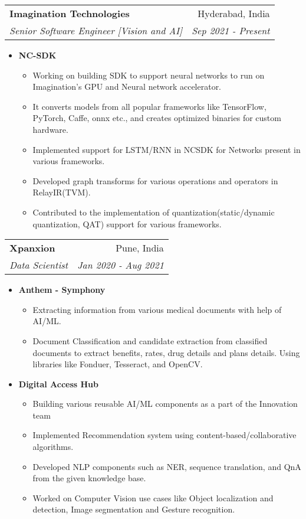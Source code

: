 \documentclass[letterpaper,11pt]{article}
\makeatletter
\newcommand{\resumeItem}[1]{
  \item\small{
    \textbf{#1}}
  }
\newcommand{\resumeSubheading}[4]{
  \vspace{-1pt}\item
    \begin{tabular*}{0.97\textwidth}[t]{l@{\extracolsep{\fill}}r}
      \textbf{#1} & #2 \\
      \textit{\small#3} & \textit{\small #4} \\
    \end{tabular*}\vspace{-5pt}
}
\newcommand{\resumeItemListStart}{\begin{itemize}}
\newcommand{\resumeItemListEnd}{\end{itemize}\vspace{-4pt}}
\newcommand{\resumeSubPointS}{\begin{itemize}}
\newcommand{\resumeSubPointE}{\end{itemize}\vspace{-4pt}}
\makeatother
\begin{document}
  \resumeSubheading
      {Imagination Technologies}{Hyderabad, India}
      {Senior Software Engineer [Vision and AI]}{Sep 2021 - Present}
      \resumeItemListStart
      	\resumeItem{NC-SDK}
        	\resumeSubPointS
   		\item Working on building SDK to support neural networks to run on Imagination's GPU and Neural network accelerator.
        		\item It converts models from all popular frameworks like TensorFlow, PyTorch, Caffe, onnx etc., and creates optimized binaries for custom hardware.
        		\item Implemented support for LSTM/RNN in  NCSDK for Networks present in various frameworks.
        		\item Developed graph transforms for various operations and operators in RelayIR(TVM).
        		\item Contributed to the implementation of quantization(static/dynamic quantization, QAT) support for various frameworks.
        		
        	\resumeSubPointE
      \resumeItemListEnd  
  
  \resumeSubheading
      {Xpanxion}{Pune, India}
      {Data Scientist}{Jan 2020 - Aug 2021}
      \resumeItemListStart
      	\resumeItem{Anthem - Symphony}
        	\resumeSubPointS
        		\item Extracting information from various medical documents with help of AI/ML. 
        		\item Document Classification and candidate extraction from classified documents to extract benefits, rates, drug details and plans details. Using libraries like Fonduer, Tesseract, and OpenCV.
        		
        	\resumeSubPointE
        \resumeItem{Digital Access Hub}
        	\resumeSubPointS
        		\item Building various reusable AI/ML components as a part of the Innovation team 
        		\item Implemented Recommendation system using content-based/collaborative algorithms.
        		\item Developed NLP components such as NER, sequence translation, and QnA from the given knowledge base.
        		\item Worked on Computer Vision use cases like Object localization and detection, Image segmentation and Gesture recognition.		
        	\resumeSubPointE
          
      \resumeItemListEnd
\end{document}
